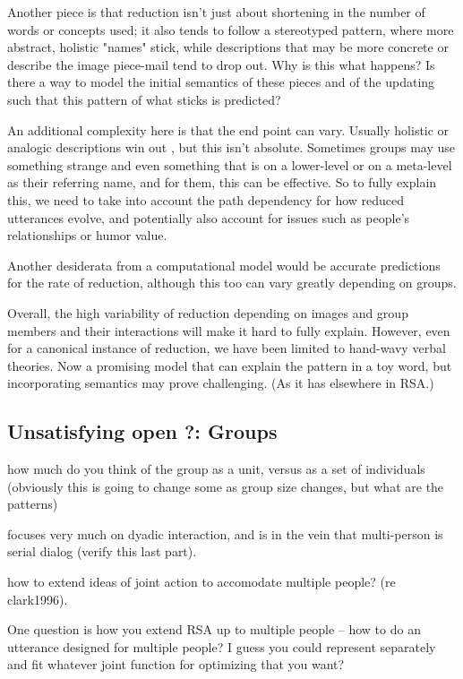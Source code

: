 \documentclass[]{article}
\begin{document}
Another piece is that reduction isn't just about shortening in the number of words or concepts used; it also tends to follow a stereotyped pattern, where more abstract, holistic "names" stick, while descriptions that may be more concrete or describe the image piece-mail tend to drop out. Why is this what happens?  Is there a way to model the initial semantics of these pieces and of the updating such that this pattern of what sticks is predicted? 

An additional complexity here is that the end point can vary. Usually holistic or analogic descriptions win out \cite{clark1986}, but this isn't absolute. Sometimes groups may use something strange and even something that is on a lower-level or on a meta-level as their referring name, and for them, this can be effective. So to fully explain this, we need to take into account the path dependency for how reduced utterances evolve, and potentially also account for issues such as people's relationships or humor value. 

Another desiderata from a computational model would be accurate predictions for the rate of reduction, although this too can vary greatly depending on groups. 

Overall, the high variability of reduction depending on images and group members and their interactions will make it hard to fully explain. However, even for a canonical instance of reduction, we have been limited to hand-wavy verbal theories. Now a promising model that can explain the pattern in a toy word, but incorporating semantics may prove challenging. (As it has elsewhere in RSA.) 








\subsection{Unsatisfying open ?: Groups}


\cite{yoon2019} how much do you think of the group as a unit, versus as a set of individuals (obviously this is going to change some as group size changes, but what are the patterns) 

\cite{clark1996} focuses very much on dyadic interaction, and is in the vein that multi-person is serial dialog (verify this last part). 

how to extend ideas of joint action to accomodate multiple people? (re clark1996). 

One question is how you extend RSA up to multiple people -- how to do an utterance designed for multiple people? I guess you could represent separately and fit whatever joint function for optimizing that you want? 
\end{document}
